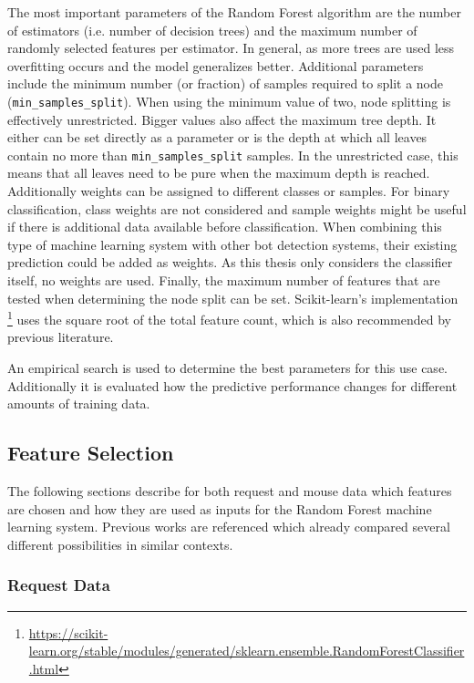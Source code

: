 \documentclass[
    fontsize=12pt,
    headings=small,
    parskip=half,           %
    bibliography=totoc,
    numbers=noenddot,       %
    open=any,               %
    final,                   %
    table
]{scrreprt}
\begin{document}
The most important parameters of the Random Forest algorithm are the number of estimators (i.e. number of decision trees) and the maximum number of randomly selected features per estimator. In general, as more trees are used less overfitting occurs and the model generalizes better. Additional parameters include the minimum number (or fraction) of samples required to split a node (\lstinline{min_samples_split}). When using the minimum value of two, node splitting is effectively unrestricted. Bigger values also affect the maximum tree depth. It either can be set directly as a parameter or is the depth at which all leaves contain no more than \lstinline{min_samples_split} samples. In the unrestricted case, this means that all leaves need to be pure when the maximum depth is reached. Additionally weights can be assigned to different classes or samples. For binary classification, class weights are not considered and sample weights might be useful if there is additional data available before classification. When combining this type of machine learning system with other bot detection systems, their existing prediction could be added as weights. As this thesis only considers the classifier itself, no weights are used. Finally, the maximum number of features that are tested when determining the node split can be set. Scikit-learn's implementation \footnote{\url{https://scikit-learn.org/stable/modules/generated/sklearn.ensemble.RandomForestClassifier.html}} uses the square root of the total feature count, which is also recommended by previous literature. \cite{Hastie2009}

An empirical search is used to determine the best parameters for this use case. Additionally it is evaluated how the predictive performance changes for different amounts of training data.

\subsection{Feature Selection}

The following sections describe for both request and mouse data which features are chosen and how they are used as inputs for the Random Forest machine learning system. Previous works are referenced which already compared several different possibilities in similar contexts.

\label{concept_request_data}
\subsubsection{Request Data}
\end{document}
